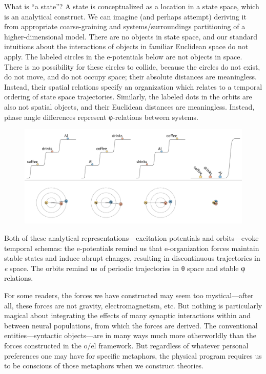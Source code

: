   What is “a state”? A state is conceptualized as a location in a state space, which is an analytical construct. We can imagine (and perhaps attempt) deriving it from appropriate coarse-graining and systems/surroundings partitioning of a higher-dimensional model. There are no objects in state space, and our standard intuitions about the interactions of objects in familiar Euclidean space do not apply. The labeled circles in the e-potentials below are not objects in space. There is no possibility for these circles to collide, because the circles do not exist, do not move, and do not occupy space; their absolute distances are meaningless. Instead, their spatial relations specify an organization which relates to a temporal ordering of state space trajectories. Similarly, the labeled dots in the orbits are also not spatial objects, and their Euclidean distances are meaningless. Instead, phase angle differences represent φ-relations between systems.

  
\begin{figure}
\includegraphics[width=\textwidth]{figures/Tilsen-img168.png}
\caption{\missingcaption}
\label{fig:8:2}
\end{figure}
 

  Both of these analytical representations—excitation potentials and orbits—evoke temporal schemas: the e-potentials remind us that e-organization forces maintain stable states and induce abrupt changes, resulting in discontinuous trajectories in \textit{e} space. The orbits remind us of periodic trajectories in θ space and stable φ relations.

  For some readers, the forces we have constructed may seem too mystical—after all, these forces are not gravity, electromagnetism, etc. But nothing is particularly magical about integrating the effects of many synaptic interactions within and between neural populations, from which the forces are derived. The conventional entities—syntactic objects—are in many ways much more otherworldly than the forces constructed in the o/el framework. But regardless of whatever personal preferences one may have for specific metaphors, the physical program requires us to be conscious of those metaphors when we construct theories.

